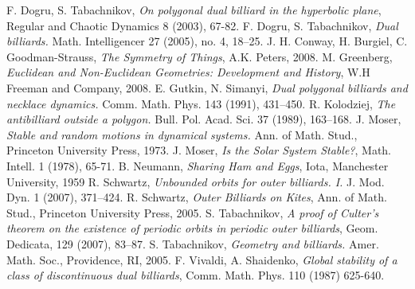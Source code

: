 \documentclass[11pt, oneside]{article}   	%
\begin{document}
\newpage
\begin{thebibliography}{99}
 F. Dogru, S. Tabachnikov,  \textit{On polygonal dual billiard in the hyperbolic plane},
Regular and Chaotic Dynamics 8 (2003), 67-82.
 F. Dogru, S. Tabachnikov,  \textit{Dual billiards.} Math. Intelligencer 27 (2005), no. 4, 18--25. 
 J. H. Conway, H. Burgiel, C. Goodman-Strauss, \textit{The Symmetry of Things}, A.K. Peters, 2008.
 M.  Greenberg, \textit{Euclidean and Non-Euclidean Geometries: Development and History}, W.H Freeman and Company, 2008.
 E. Gutkin, N. Simanyi, {\it Dual polygonal billiards and necklace dynamics.} Comm. Math. Phys. 143 (1991), 431--450.
 R. Kolodziej, {\it The antibilliard outside a polygon.} Bull. Pol. Acad. Sci. 37 (1989), 163--168.
 J. Moser, \textit{Stable and random motions in dynamical systems.} Ann. of Math. Stud., Princeton University Press, 1973.
 J. Moser, \textit{Is the Solar System Stable?}, Math. Intell. 1 (1978), 65-71.
 B. Neumann, \textit{Sharing Ham and Eggs}, Iota, Manchester University, 1959
 R.  Schwartz, \textit{Unbounded orbits for outer billiards. I.} J. Mod. Dyn. 1 (2007), 371--424. 
 R.  Schwartz, \textit{Outer Billiards on Kites}, Ann. of Math. Stud., Princeton University Press, 2005.
 S. Tabachnikov, \textit{A proof of Culter's theorem on the existence of periodic orbits in periodic outer billiards}, Geom. Dedicata, 129 (2007), 83--87.
 S. Tabachnikov, \textit{Geometry and billiards.} Amer. Math. Soc., Providence, RI, 2005.
  F. Vivaldi, A. Shaidenko, \textit{Global stability of a class of discontinuous dual billiards}, Comm. Math. Phys. 110 (1987) 625-640.



\end{thebibliography}
\end{document}
